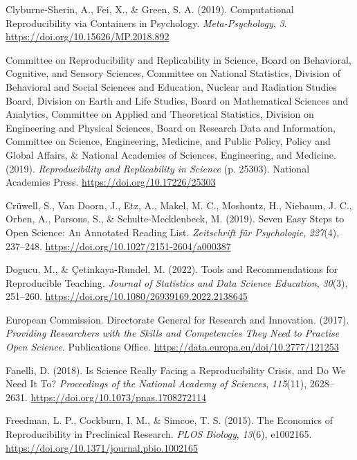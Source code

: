 \documentclass[
  a4paper,
]{article}
\newlength{\cslhangindent}
\newenvironment{CSLReferences}[2] %
 {\begin{list}{}{%
  \setlength{\itemindent}{0pt}
  \setlength{\leftmargin}{0pt}
  \setlength{\parsep}{0pt}
  \ifodd #1
   \setlength{\leftmargin}{\cslhangindent}
   \setlength{\itemindent}{-1\cslhangindent}
  \fi
  \setlength{\itemsep}{#2\baselineskip}}}
 {\end{list}}
\begin{document}
\begin{CSLReferences}{1}{0}
Clyburne-Sherin, A., Fei, X., \& Green, S. A. (2019). Computational
{Reproducibility} via {Containers} in {Psychology}.
\emph{Meta-Psychology}, \emph{3}.
\url{https://doi.org/10.15626/MP.2018.892}

Committee on Reproducibility and Replicability in Science, Board on
Behavioral, Cognitive, and Sensory Sciences, Committee on National
Statistics, Division of Behavioral and Social Sciences and Education,
Nuclear and Radiation Studies Board, Division on Earth and Life Studies,
Board on Mathematical Sciences and Analytics, Committee on Applied and
Theoretical Statistics, Division on Engineering and Physical Sciences,
Board on Research Data and Information, Committee on Science,
Engineering, Medicine, and Public Policy, Policy and Global Affairs, \&
National Academies of Sciences, Engineering, and Medicine. (2019).
\emph{Reproducibility and {Replicability} in {Science}} (p. 25303).
National Academies Press. \url{https://doi.org/10.17226/25303}

Crüwell, S., Van Doorn, J., Etz, A., Makel, M. C., Moshontz, H.,
Niebaum, J. C., Orben, A., Parsons, S., \& Schulte-Mecklenbeck, M.
(2019). Seven {Easy Steps} to {Open Science}: {An Annotated Reading
List}. \emph{Zeitschrift f{ü}r Psychologie}, \emph{227}(4), 237--248.
\url{https://doi.org/10.1027/2151-2604/a000387}

Dogucu, M., \& Çetinkaya-Rundel, M. (2022). Tools and {Recommendations}
for {Reproducible Teaching}. \emph{Journal of Statistics and Data
Science Education}, \emph{30}(3), 251--260.
\url{https://doi.org/10.1080/26939169.2022.2138645}

European Commission. Directorate General for Research and Innovation.
(2017). \emph{Providing Researchers with the Skills and Competencies
They Need to Practise {Open Science}.} Publications Office.
\url{https://data.europa.eu/doi/10.2777/121253}

Fanelli, D. (2018). Is Science Really Facing a Reproducibility Crisis,
and Do We Need It To? \emph{Proceedings of the National Academy of
Sciences}, \emph{115}(11), 2628--2631.
\url{https://doi.org/10.1073/pnas.1708272114}

Freedman, L. P., Cockburn, I. M., \& Simcoe, T. S. (2015). The
{Economics} of {Reproducibility} in {Preclinical Research}. \emph{PLOS
Biology}, \emph{13}(6), e1002165.
\url{https://doi.org/10.1371/journal.pbio.1002165}


\end{CSLReferences}
\end{document}
